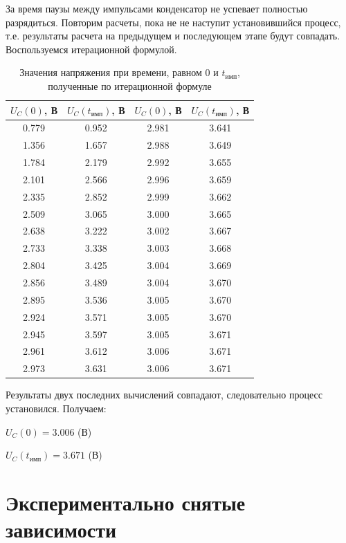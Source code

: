За время паузы между импульсами конденсатор не успевает полностью разрядиться. Повторим расчеты, пока не не наступит установившийся процесс, т.е. результаты расчета на предыдущем и последующем этапе будут совпадать.	Воспользуемся итерационной формулой.
\begin{table}[H]

	\begin{center}
	\caption{Значения напряжения при времени, равном $0$ и $t_\text{имп}$, полученные по итерационной формуле}
	\begin{tabular}{|c|c||c|c|}
		\hline 
		$U_C(0)$, В & $U_C(t_\text{имп})$, В & $U_C(0)$, В & $U_C(t_\text{имп})$, В\\ 
		\hline 
		0.779 & 0.952 & 2.981 & 3.641 \\ 
		\hline 
		1.356 & 1.657 & 2.988 & 3.649 \\ 
		\hline 
		1.784 & 2.179 & 2.992 & 3.655 \\
		\hline 
		2.101 & 2.566 & 2.996 & 3.659 \\
		\hline 
		2.335 & 2.852 & 2.999 & 3.662 \\ 
		\hline 
		2.509 & 3.065 & 3.000 & 3.665 \\
		\hline 
		2.638 & 3.222 & 3.002 & 3.667 \\
		\hline 
		2.733 & 3.338 & 3.003 & 3.668 \\ 
		\hline 
		2.804 & 3.425 & 3.004 & 3.669 \\
		\hline 
		2.856 & 3.489 & 3.004 & 3.670 \\
		\hline 
		2.895 & 3.536 & 3.005 & 3.670 \\ 
		\hline 
		2.924 & 3.571 & 3.005 & 3.670 \\ 
		\hline 
		2.945 & 3.597 & 3.005 & 3.671 \\ 
		\hline 
		2.961 & 3.612 & 3.006 & 3.671 \\ 
		\hline 
		2.973 & 3.631 & 3.006 & 3.671 \\ 
		\hline 
		\end{tabular}  	
		
	\end{center}
\end{table}
	Результаты двух последних вычислений совпадают, следовательно процесс установился. Получаем:
	
	$U_C(0) = 3.006$ (В)
	
	$U_C(t_\text{имп}) = 3.671$ (В)

\section{Экспериментально снятые зависимости}

